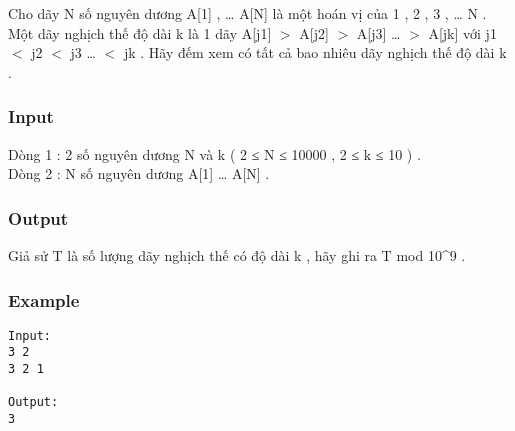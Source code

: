 



   Cho dãy N số nguyên dương A[1] , … A[N] là một hoán vị của 1 , 2 , 3 , … N .   
\\   Một dãy nghịch thế độ dài k là 1 dãy A[j1] $>$ A[j2] $>$ A[j3] … $>$ A[jk] với j1 $<$ j2 $<$ j3 … $<$ jk . Hãy đếm xem có tất cả bao nhiêu dãy nghịch thế độ dài k .  

\subsubsection{   Input  }

   Dòng 1 : 2 số nguyên dương N và k ( 2 ≤ N ≤ 10000 , 2 ≤ k ≤ 10 ) .   
\\   Dòng 2 : N số nguyên dương A[1] … A[N] .  

\subsubsection{   Output  }

   Giả sử T là số lượng dãy nghịch thế có độ dài k , hãy ghi ra T mod 10\textasciicircum9 .  

\subsubsection{   Example  }
\begin{verbatim}
Input:
3 2
3 2 1

Output:
3
\end{verbatim}